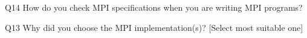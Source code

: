 \begin{description}%
\item{Q14} How do you check MPI specifications when you are writing MPI programs?%
\item{Q13} Why did you choose the MPI implementation(s)? [Select most suitable one]%
\end{description}%
